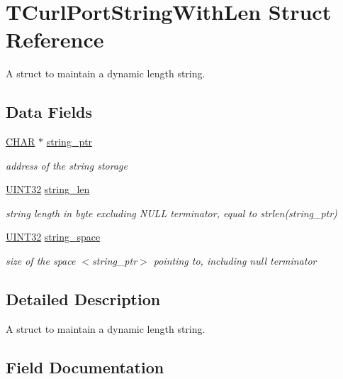 \hypertarget{struct_t_curl_port_string_with_len}{}\section{T\+Curl\+Port\+String\+With\+Len Struct Reference}
\label{struct_t_curl_port_string_with_len}


A struct to maintain a dynamic length string.  


\subsection*{Data Fields}
\begin{DoxyCompactItemize}
\item 
\mbox{\hyperlink{boattypes_8h_aebb9e13210d88d43e32e735ada43a425}{C\+H\+AR}} $\ast$ \mbox{\hyperlink{struct_t_curl_port_string_with_len_ac2b26a2487af8ce48217b0b1f3890710}{string\+\_\+ptr}}
\begin{DoxyCompactList}\small\item\em address of the string storage \end{DoxyCompactList}\item 
\mbox{\hyperlink{boattypes_8h_ae1e6edbbc26d6fbc71a90190d0266018}{U\+I\+N\+T32}} \mbox{\hyperlink{struct_t_curl_port_string_with_len_af6320afbf95a767066abeb2119778072}{string\+\_\+len}}
\begin{DoxyCompactList}\small\item\em string length in byte excluding N\+U\+LL terminator, equal to strlen(string\+\_\+ptr) \end{DoxyCompactList}\item 
\mbox{\hyperlink{boattypes_8h_ae1e6edbbc26d6fbc71a90190d0266018}{U\+I\+N\+T32}} \mbox{\hyperlink{struct_t_curl_port_string_with_len_ad0ed73766a322bfb92ce6f8cedc29bf8}{string\+\_\+space}}
\begin{DoxyCompactList}\small\item\em size of the space $<$string\+\_\+ptr$>$ pointing to, including null terminator \end{DoxyCompactList}\end{DoxyCompactItemize}


\subsection{Detailed Description}
A struct to maintain a dynamic length string. 

\subsection{Field Documentation}
\mbox{\label{struct_t_curl_port_string_with_len_af6320afbf95a767066abeb2119778072}} 
